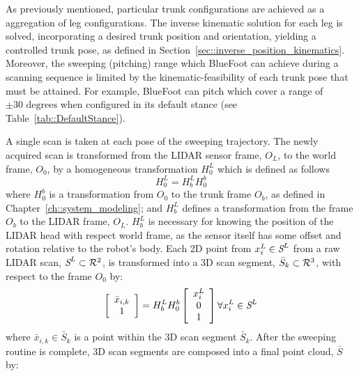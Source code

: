 			As previously mentioned, particular trunk configurations are achieved as a aggregation of leg configurations. The inverse kinematic solution for each leg is solved, incorporating a desired trunk position and orientation, yielding a controlled trunk pose, as defined in Section~\ref{sec::inverse_position_kinematics}. Moreover, the sweeping (pitching) range which BlueFoot can achieve during a scanning sequence is limited by the kinematic-feasibility of each \Kth trunk pose that must be attained. For example, BlueFoot can pitch which cover a range of $\pm 30\text{ degrees}$ when configured in its default stance (see Table~\ref{tab::DefaultStance}).

			A single scan is taken at each \Kth pose of the sweeping trajectory. The newly acquired scan is transformed from the LIDAR sensor frame, $O_{L}$, to the world frame, $O_{0}$, by a homogeneous transformation $H^{L}_{0}$ which is defined as follows
				\begin{equation}
					H^{L}_{0} = H^{L}_{b} H^{b}_{0}
					\label{eq::world_to_sensor}
				\end{equation}
			where $H^{b}_{0}$ is a transformation from $O_{0}$ to the trunk frame $O_{b}$, as defined in Chapter~\ref{ch::system_modeling}; and $H^{L}_{b}$ defines a transformation from the frame $O_{b}$ to the LIDAR frame, $O_{L}$. $H^{L}_{b}$ is necessary for knowing the position of the LIDAR head with respect world frame, as the sensor itself has some offset and rotation relative to the robot's body. Each 2D point from $x_{i}^{L} \in \emph{S}^{L}$ from a raw LIDAR scan, $\emph{S}^{L} \subset {\cal R}^{2}$, is transformed into a 3D scan segment, $\bar{S}_{k} \subset {\cal R}^{3}$, with respect to the frame $O_{0}$ by:
				\begin{equation}
					\left[
						\begin{array}{c}
							\bar{x}_{i,k} \\ 1
						\end{array}
					\right]
				 = H^{L}_{b} H^{b}_{0}	
					\left[
						\begin{array}{c}
							x_{i}^{L} \\ 0 \\ 1
						\end{array}
					\right] \forall x_{i}^{L} \in \emph{S}^{L}
					\label{eq::scan_to_segment}
				\end{equation}
			where $\bar{x}_{i,k} \in \bar{S}_{k}$ is a point within the \Kth 3D scan segment $\bar{S}_{k}$. After the sweeping routine is complete, 3D scan segments are composed into a final point cloud, $\bar{S}$ by:
